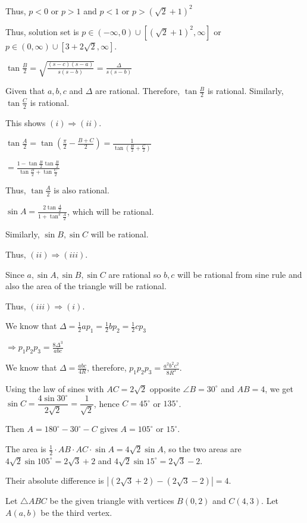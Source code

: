   Thus, $p < 0$ or $p > 1$ and $p < 1$ or $p > \left(\sqrt{2} + 1\right)^2$

  Thus, solution set is $p\in(-\infty, 0)\cup [\left(\sqrt{2} + 1\right)^2, \infty]$ or $p\in(0, \infty)\cup
  [3 + 2\sqrt{2}, \infty]$.
\item $\tan\frac{B}{2} = \sqrt{\frac{(s - c)(s - a)}{s(s - b)}} = \frac{\Delta}{s(s - b)}$

  Given that $a, b, c$ and $\Delta$ are rational. Therefore, $\tan\frac{B}{2}$ is rational. Similarly,
  $\tan\frac{C}{2}$ is rational.

  This shows $(i)\Rightarrow (ii)$.

  $\tan\frac{A}{2} = \tan\left(\frac{\pi}{2} - \frac{B + C}{2}\right) = \frac{1}{\tan\left(\frac{B}{2}
    + \frac{C}{2}\right)}$

  $= \frac{1 - \tan\frac{B}{2}\tan\frac{B}{2}}{\tan\frac{B}{2} + \tan\frac{C}{2}}$

  Thus, $\tan\frac{A}{2}$ is also rational.

  $\sin A = \frac{2\tan\frac{A}{2}}{1 + \tan^2\frac{A}{2}}$, which will be rational.

  Similarly, $\sin B, \sin C$ will be rational.

  Thus, $(ii)\Rightarrow (iii)$.

  Since $a, \sin A, \sin B, \sin C$ are rational so $b, c$ will be rational from sine rule and also the area
  of the triangle will be rational.

  Thus, $(iii)\Rightarrow (i)$.
\item We know that $\Delta = \frac{1}{2}ap_1 = \frac{1}{2}bp_2 = \frac{1}{2}cp_3$

  $\Rightarrow p_1p_2p_3 = \frac{8\Delta^3}{abc}$

  We know that $\Delta = \frac{abc}{4R}$, therefore, $p_1p_2p_3 = \frac{a^2b^2c^2}{8R^3}$.
\item Using the law of sines with $AC=2\sqrt2$ opposite $\angle B=30^\circ$ and $AB=4$, we get $\sin
  C=\dfrac{4\sin30^\circ}{2\sqrt2}=\dfrac1{\sqrt2}$, hence $C=45^\circ$ or $135^\circ$.

  Then $A=180^\circ-30^\circ-C$ gives $A=105^\circ$ or $15^\circ$.

  The area is $\tfrac12\cdot AB\cdot AC\cdot\sin A=4\sqrt2\sin A$, so the two areas are
  $4\sqrt2\sin105^\circ=2\sqrt3+2$ and $4\sqrt2\sin15^\circ=2\sqrt3-2$.

  Their absolute difference is $|(2\sqrt3+2)-(2\sqrt3-2)|=4$.
\item Let $\triangle ABC$ be the given triangle with vertices $B(0, 2)$ and $C(4, 3)$. Let $A(a, b)$ be the
  third vertex.

